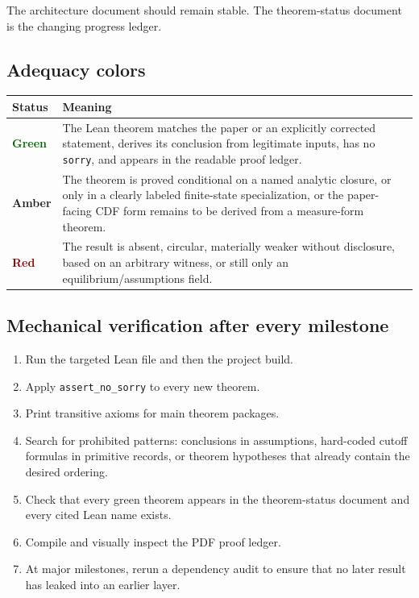 \documentclass[11pt]{article}
\begin{document}
The architecture document should remain stable. The theorem-status document is the changing progress ledger.

\subsection{Adequacy colors}

\begin{center}
\begin{tabularx}{0.94\textwidth}{@{}p{}X@{}}
\toprule
Status & Meaning \\
\midrule
\textcolor{darkGreen}{\textbf{Green}} & The Lean theorem matches the paper or an explicitly corrected statement, derives its conclusion from legitimate inputs, has no \texttt{sorry}, and appears in the readable proof ledger. \\
\textcolor{darkAmber}{\textbf{Amber}} & The theorem is proved conditional on a named analytic closure, or only in a clearly labeled finite-state specialization, or the paper-facing CDF form remains to be derived from a measure-form theorem. \\
\textcolor{darkRed}{\textbf{Red}} & The result is absent, circular, materially weaker without disclosure, based on an arbitrary witness, or still only an equilibrium/assumptions field. \\
\bottomrule
\end{tabularx}
\end{center}

\subsection{Mechanical verification after every milestone}

\begin{enumerate}
\item Run the targeted Lean file and then the project build.
\item Apply \texttt{assert\_no\_sorry} to every new theorem.
\item Print transitive axioms for main theorem packages.
\item Search for prohibited patterns: conclusions in assumptions, hard-coded cutoff formulas in primitive records, or theorem hypotheses that already contain the desired ordering.
\item Check that every green theorem appears in the theorem-status document and every cited Lean name exists.
\item Compile and visually inspect the PDF proof ledger.
\item At major milestones, rerun a dependency audit to ensure that no later result has leaked into an earlier layer.
\end{enumerate}
\end{document}
